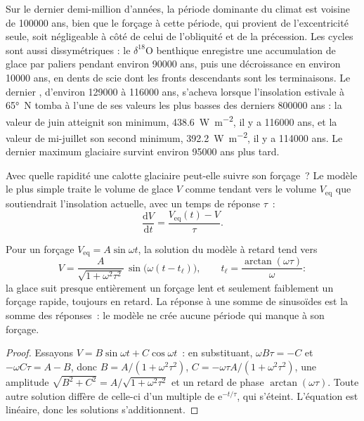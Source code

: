 Sur le dernier demi-million d'années, la période dominante du climat est voisine de \num{100000} ans,
bien que le forçage à cette période, qui provient de l'excentricité seule, soit négligeable
à côté de celui de l'obliquité et de la précession. Les cycles sont aussi dissymétriques : le $\delta^{18}$O benthique
enregistre une accumulation de glace par paliers pendant environ \num{90000} ans, puis une décroissance en environ
\num{10000} ans, en dents de scie dont les fronts descendants sont les terminaisons. Le dernier , d'environ
\num{129000} à \num{116000} ans, s'acheva lorsque l'insolation estivale à \ang{65}~N tomba à l'une de ses valeurs
les plus basses des derniers \num{800000} ans : la valeur de juin atteignit son minimum,
\qty{438.6}{W.m^{-2}}, il y a \num{116000} ans, et la valeur de mi-juillet son second minimum,
\qty{392.2}{W.m^{-2}}, il y a \num{114000} ans. Le dernier maximum glaciaire survint
environ \num{95000} ans plus tard.

Avec quelle rapidité une calotte glaciaire peut-elle suivre son forçage~? Le modèle le plus simple traite le volume de glace $V$ comme
tendant vers le volume $V_{\mathrm{eq}}$ que soutiendrait l'insolation actuelle, avec un
temps de réponse $\tau$~:
\[
  \frac{\mathrm dV}{\mathrm dt} = \frac{V_{\mathrm{eq}}(t) - V}{\tau} .
\]

\begin{proposition}\label{prop:b2:orbital-forcing:lag}
Pour un forçage $V_{\mathrm{eq}} = A\sin\omega t$, la solution du modèle à retard tend vers
\[
  V = \frac{A}{\sqrt{1 + \omega^2\tau^2}}\,\sin\bigl(\omega(t - t_{\ell})\bigr),\qquad
  t_{\ell} = \frac{\arctan(\omega\tau)}{\omega} :
\]
la glace suit presque entièrement un forçage lent et seulement faiblement un forçage rapide, toujours en retard. La réponse
à une somme de sinusoïdes est la somme des réponses~: le modèle ne crée aucune
période qui manque à son forçage.
\end{proposition}

\begin{proof}
Essayons $V = B\sin\omega t + C\cos\omega t$~: en substituant, $\omega B\tau = -C$ et $-\omega C\tau = A -
B$, donc $B = A/(1 + \omega^2\tau^2)$, $C = -\omega\tau A/(1 + \omega^2\tau^2)$, une amplitude
$\sqrt{B^2 + C^2} = A/\sqrt{1 + \omega^2\tau^2}$ et un retard de phase $\arctan(\omega\tau)$. Toute autre
solution diffère de celle-ci d'un multiple de $\mathrm e^{-t/\tau}$, qui s'éteint. L'équation
est linéaire, donc les solutions s'additionnent.
\end{proof}

